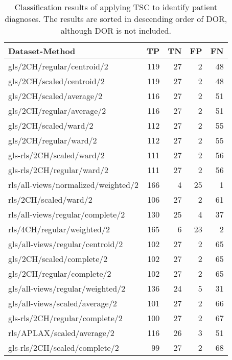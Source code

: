 \begin{longtable}{lrrrr}
    \caption{Classification results of applying TSC to identify patient diagnoses.
             The results are sorted in descending order of DOR, although DOR is not included.}
    \label{tab:tsc_ind_raw_results}\\
    \hline
    Dataset-Method                            &  TP & TN & FP & FN \\
    \hline
    gls/2CH/regular/centroid/2                & 119 & 27 &  2 & 48 \\
    gls/2CH/scaled/centroid/2                 & 119 & 27 &  2 & 48 \\
    gls/2CH/scaled/average/2                  & 116 & 27 &  2 & 51 \\
    gls/2CH/regular/average/2                 & 116 & 27 &  2 & 51 \\
    gls/2CH/scaled/ward/2                     & 112 & 27 &  2 & 55 \\
    gls/2CH/regular/ward/2                    & 112 & 27 &  2 & 55 \\
    gls-rls/2CH/scaled/ward/2                 & 111 & 27 &  2 & 56 \\
    gls-rls/2CH/regular/ward/2                & 111 & 27 &  2 & 56 \\
    rls/all-views/normalized/weighted/2       & 166 &  4 & 25 &  1 \\
    rls/2CH/scaled/ward/2                     & 106 & 27 &  2 & 61 \\
    rls/all-views/regular/complete/2          & 130 & 25 &  4 & 37 \\
    rls/4CH/regular/weighted/2                & 165 &  6 & 23 &  2 \\
    gls/all-views/regular/centroid/2          & 102 & 27 &  2 & 65 \\
    gls/2CH/scaled/complete/2                 & 102 & 27 &  2 & 65 \\
    gls/2CH/regular/complete/2                & 102 & 27 &  2 & 65 \\
    gls/all-views/regular/weighted/2          & 136 & 24 &  5 & 31 \\
    gls/all-views/scaled/average/2            & 101 & 27 &  2 & 66 \\
    gls-rls/2CH/regular/complete/2            & 100 & 27 &  2 & 67 \\
    rls/APLAX/scaled/average/2                & 116 & 26 &  3 & 51 \\
    gls-rls/2CH/scaled/complete/2             &  99 & 27 &  2 & 68 \\

\end{longtable}
